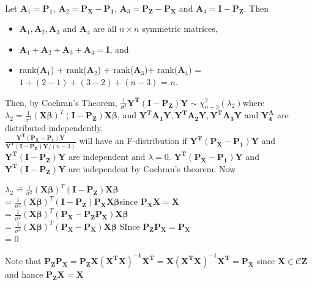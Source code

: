 \documentclass[soln,12pt]{utarexam}
\begin{document}
\begin{enumerate}
\begin{enumerate}
\begin{answer}~

Let $\mathbf{A}_1 = \mathbf{P_1}$, $\mathbf{A}_2 = \mathbf{P_X-P_1}$, $\mathbf{A}_3 = \mathbf{P_Z-P_X}$ and $\mathbf{A}_4 = \mathbf{I-P_Z}$. Then
\begin{itemize}
\item $\mathbf{A}_1, \mathbf{A}_2, \mathbf{A}_3$ and $\mathbf{A}_4$ are all $n \times n$ symmetric matrices,
\item $\mathbf{A}_1 + \mathbf{A}_2 + \mathbf{A}_3+ \mathbf{A}_4 = \mathbf{I}$, and
\item rank($\mathbf{A}_1$) + rank($\mathbf{A}_2$) + rank($\mathbf{A}_3$)+ rank($\mathbf{A}_4$) = $1 + (2-1) + (3-2) +(n-3)$ = $n$.
\end{itemize}
Then, by Cochran's Theorem,
$\frac{1}{\sigma^2}\mathbf{Y^T(I-P_Z)Y} \sim \chi^2_{n-3}(\lambda_2)$where $\lambda_2 =\frac{1}{\sigma^2}(\mathbf{X}\bm{\beta})^T(\mathbf{I-P_Z})\mathbf{X}\bm{\beta}$, and $\mathbf{Y^TA_1Y}, \mathbf{Y^TA_2Y}, \mathbf{Y^TA_3Y}$ and $\mathbf{Y^A_4}$ are distributed independently.\\
$\frac{\mathbf{Y^T(P_X-P_1)Y}}{\mathbf{Y^T(I-P_Z)Y}/(n-3)}$  will have an F-distribution if $\mathbf{Y^T(P_X-P_1)Y}$ and $\mathbf{Y^T(I-P_Z)Y}$ are independent and $\lambda = 0$.  $\mathbf{Y^T(P_X-P_1)Y}$ and $\mathbf{Y^T(I-P_Z)Y}$ are independent by Cochran's theorem. Now
\begin{tabbing}
$\lambda_2$ \== $\frac{1}{\sigma^2}(\mathbf{X}\bm{\beta})^T(\mathbf{I-P_Z})\mathbf{X}\bm{\beta}$\\
\>= $\frac{1}{\sigma^2}(\mathbf{X}\bm{\beta})^T(\mathbf{I-P_Z})\mathbf{P_XX}\bm{\beta}$since $\mathbf{P_XX} = \mathbf{X}$\\
\>= $\frac{1}{\sigma^2}(\mathbf{X}\bm{\beta})^T(\mathbf{P_X-P_ZP_X})\mathbf{X}\bm{\beta}$\\
\>= $\frac{1}{\sigma^2}(\mathbf{X}\bm{\beta})^T(\mathbf{P_X-P_X})\mathbf{X}\bm{\beta}$ SInce $\mathbf{P_ZP_X = P_X}$\\
\>= 0
\end{tabbing}
Note that
$\mathbf{P_ZP_X} = \mathbf{P_ZX(X^TX)^{-1}X^T} = \mathbf{X(X^TX)^{-1}X^T} = \mathbf{P_X}$ since $\mathbf{X} \in \mathcal{C}\mathbf{Z}$ and hance $\mathbf{P_ZX} = \mathbf{X}$
\end{answer}
\end{enumerate}



\end{enumerate}
\end{document}
